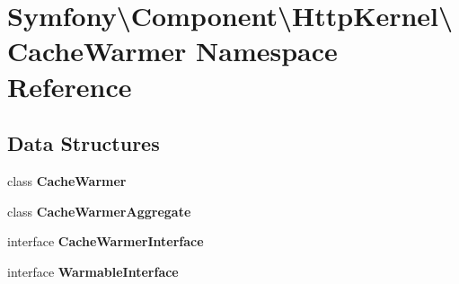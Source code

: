\section{Symfony\textbackslash{}Component\textbackslash{}Http\+Kernel\textbackslash{}Cache\+Warmer Namespace Reference}
\label{namespace_symfony_1_1_component_1_1_http_kernel_1_1_cache_warmer}
\subsection*{Data Structures}
\begin{DoxyCompactItemize}
\item 
class {\bf Cache\+Warmer}
\item 
class {\bf Cache\+Warmer\+Aggregate}
\item 
interface {\bf Cache\+Warmer\+Interface}
\item 
interface {\bf Warmable\+Interface}
\end{DoxyCompactItemize}
